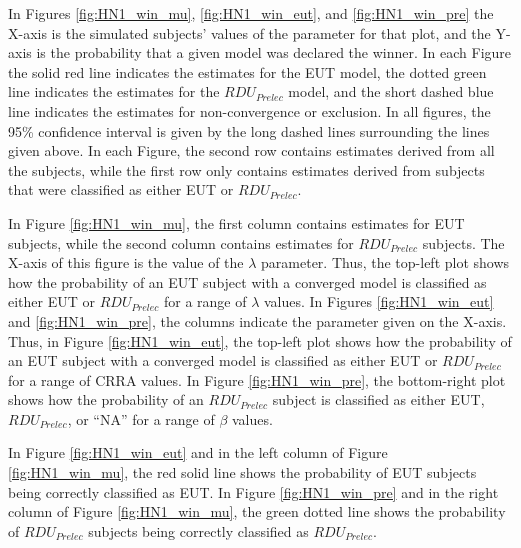 \documentclass[../main.tex]{subfiles}
\begin{document}
In Figures \ref{fig:HN1_win_mu}, \ref{fig:HN1_win_eut}, and \ref{fig:HN1_win_pre} the X-axis is the simulated subjects' values of the parameter for that plot, and the Y-axis is the probability that a given model was declared the winner.
In each Figure the solid red line indicates the estimates for the EUT model, the dotted green line indicates the estimates for the $\mathit{RDU_{Prelec}}$ model, and the short dashed blue line indicates the estimates for non-convergence or exclusion.
In all figures, the 95\% confidence interval is given by the long dashed lines surrounding the lines given above.
In each Figure, the second row contains estimates derived from all the subjects, while the first row only contains estimates derived from subjects that were classified as either EUT or $\mathit{RDU_{Prelec}}$.

In Figure \ref{fig:HN1_win_mu}, the first column contains estimates for EUT subjects, while the second column contains estimates for $\mathit{RDU_{Prelec}}$ subjects.
The X-axis of this figure is the value of the $\lambda$ parameter.
Thus, the top-left plot shows how the probability of an EUT subject with a converged model is classified as either EUT or $\mathit{RDU_{Prelec}}$ for a range of $\lambda$ values.
In Figures \ref{fig:HN1_win_eut} and \ref{fig:HN1_win_pre}, the columns indicate the parameter given on the X-axis.
Thus, in Figure \ref{fig:HN1_win_eut}, the top-left plot shows how the probability of an EUT subject with a converged model is classified as either EUT or $\mathit{RDU_{Prelec}}$ for a range of CRRA values.
In Figure \ref{fig:HN1_win_pre}, the bottom-right plot shows how the probability of an $\mathit{RDU_{Prelec}}$ subject is classified as either EUT, $\mathit{RDU_{Prelec}}$, or \enquote{NA} for a range of $\beta$ values.

In Figure \ref{fig:HN1_win_eut} and in the left column of Figure \ref{fig:HN1_win_mu}, the red solid line shows the probability of EUT subjects being correctly classified as EUT.
In Figure \ref{fig:HN1_win_pre} and in the right column of Figure \ref{fig:HN1_win_mu}, the green dotted line shows the probability of $\mathit{RDU_{Prelec}}$ subjects being correctly classified as $\mathit{RDU_{Prelec}}$.
\end{document}
